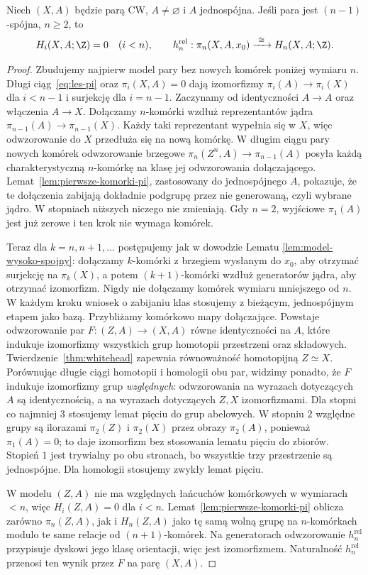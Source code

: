 \begin{twierdzenie}
\label{thm:hurewicz-wzgledny}
Niech $(X,A)$ będzie parą CW,
$A\ne\varnothing$ i $A$
jednospójna. Jeśli para
jest $(n-1)$-spójna,
$n\geq2$, to
\[
 H_i(X,A;\Z)=0\quad(i<n),
 \qquad
 h_n^{\mathrm{rel}}:
 \pi_n(X,A,x_0)
 \xrightarrow{\ \cong\ }
 H_n(X,A;\Z).
\]
\end{twierdzenie}
\begin{proof}
Zbudujemy najpierw
model pary bez nowych
komórek poniżej
wymiaru $n$.
Długi ciąg~\eqref{eq:les-pi}
oraz $\pi_i(X,A)=0$
dają izomorfizmy
$\pi_i(A)\to\pi_i(X)$
dla $i<n-1$ i
surjekcję dla
$i=n-1$.
Zaczynamy od
identyczności $A\to A$
oraz włączenia $A\to X$.
Dołączamy $n$-komórki
wzdłuż reprezentantów
jądra
$\pi_{n-1}(A)\to
\pi_{n-1}(X)$.
Każdy taki reprezentant
wypełnia się w $X$,
więc odwzorowanie do $X$
przedłuża się na
nową komórkę.
W długim ciągu
pary nowych komórek
odwzorowanie brzegowe
$\pi_n(Z^n,A)\to
\pi_{n-1}(A)$
posyła każdą
charakterystyczną
$n$-komórkę na
klasę jej odwzorowania
dołączającego.
Lemat~\ref{lem:pierwsze-komorki-pi},
zastosowany do
jednospójnego $A$,
pokazuje, że
te dołączenia
zabijają dokładnie
podgrupę przez
nie generowaną,
czyli wybrane jądro.
W stopniach
niższych niczego
nie zmieniają.
Gdy $n=2$,
wyjściowe $\pi_1(A)$
jest już zerowe
i ten krok nie
wymaga komórek.

Teraz dla $k=n,n+1,\ldots$
postępujemy jak w
dowodzie Lematu
\ref{lem:model-wysoko-spojny}:
dołączamy $k$-komórki
z brzegiem wysłanym
do $x_0$, aby
otrzymać surjekcję
na $\pi_k(X)$,
a potem
$(k+1)$-komórki
wzdłuż generatorów
jądra, aby
otrzymać izomorfizm.
Nigdy nie dołączamy
komórek wymiaru
mniejszego od $n$.
W każdym kroku wniosek o zabijaniu klas stosujemy z bieżącym,
jednospójnym etapem jako bazą. Przybliżamy komórkowo mapy dołączające.
Powstaje odwzorowanie par $F:(Z,A)\to(X,A)$
równe identyczności na $A$, które
indukuje izomorfizmy
wszystkich grup
homotopii przestrzeni
oraz składowych.
Twierdzenie~\ref{thm:whitehead}
zapewnia równoważność
homotopijną $Z\simeq X$.
Porównując długie ciągi
homotopii i homologii
obu par, widzimy
ponadto, że $F$
indukuje izomorfizmy
grup \emph{względnych}:
odwzorowania na wyrazach dotyczących $A$ są identycznością,
a na wyrazach dotyczących $Z,X$ izomorfizmami.
Dla stopni co najmniej $3$ stosujemy lemat pięciu do grup abelowych.
W stopniu $2$ względne grupy są ilorazami $\pi_2(Z)$ i $\pi_2(X)$
przez obrazy $\pi_2(A)$, ponieważ $\pi_1(A)=0$;
to daje izomorfizm bez stosowania lematu pięciu do zbiorów.
Stopień $1$ jest trywialny po obu stronach, bo wszystkie trzy przestrzenie
są jednospójne. Dla homologii stosujemy zwykły lemat pięciu.

W modelu $(Z,A)$
nie ma względnych
łańcuchów komórkowych
w wymiarach $<n$,
więc $H_i(Z,A)=0$
dla $i<n$.
Lemat~\ref{lem:pierwsze-komorki-pi}
oblicza zarówno
$\pi_n(Z,A)$,
jak i $H_n(Z,A)$
jako tę samą
wolną grupę na
$n$-komórkach
modulo te same
relacje od
$(n+1)$-komórek.
Na generatorach
odwzorowanie $h_n^{\mathrm{rel}}$
przypisuje dyskowi
jego klasę orientacji,
więc jest izomorfizmem.
Naturalność
$h_n^{\mathrm{rel}}$
przenosi ten wynik
przez $F$
na parę $(X,A)$.
\end{proof}

